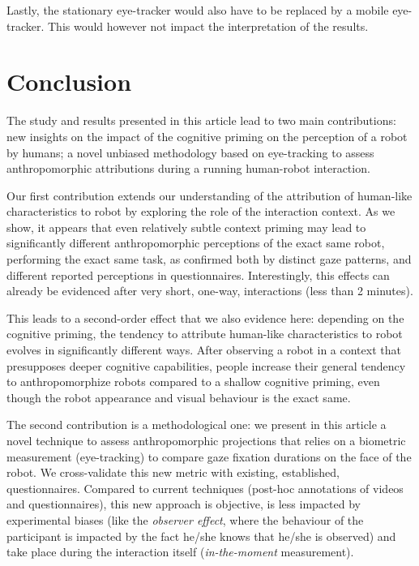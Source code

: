 \documentclass[lettersize, noapacite, twoside, HRI]{apa_HRI}
\begin{document}
Lastly, the stationary eye-tracker would also have to be replaced by a mobile
eye-tracker. This would however not impact the interpretation of the results.

\section{Conclusion}

The study and results presented in this article lead to two main contributions:
new insights on the impact of the cognitive priming on the perception of a robot
by humans; a novel unbiased methodology based on eye-tracking to assess
anthropomorphic attributions during a running human-robot interaction.

Our first contribution extends our understanding of the attribution of
human-like characteristics to robot by exploring the role of the interaction
context. As we show, it appears that even relatively subtle context
priming may lead to significantly different anthropomorphic perceptions of
the exact same robot, performing the exact same task, as confirmed both by
distinct gaze patterns, and different reported perceptions in questionnaires.
Interestingly, this effects can already be evidenced after very short,
one-way, interactions (less than 2 minutes).

This leads to a second-order effect that we also evidence here: depending on the
cognitive priming, the tendency to attribute human-like characteristics to robot
evolves in significantly different ways. After observing a robot in a
context that presupposes deeper cognitive capabilities, people increase
their general tendency to anthropomorphize robots compared to a shallow
cognitive priming, even though the robot appearance and visual behaviour is the
exact same.

The second contribution is a methodological one: we present in this article
a novel technique to assess anthropomorphic projections that relies on a
biometric measurement (eye-tracking) to compare gaze fixation durations on
the face of the robot. We cross-validate this new metric with existing,
established, questionnaires. Compared to current techniques (post-hoc
annotations of videos and questionnaires), this new approach is objective,
is less impacted by experimental biases (like the \emph{observer effect},
where the behaviour of the participant is impacted by the fact he/she knows that
he/she is observed) and take place during the interaction itself
(\emph{in-the-moment} measurement).
\end{document}
